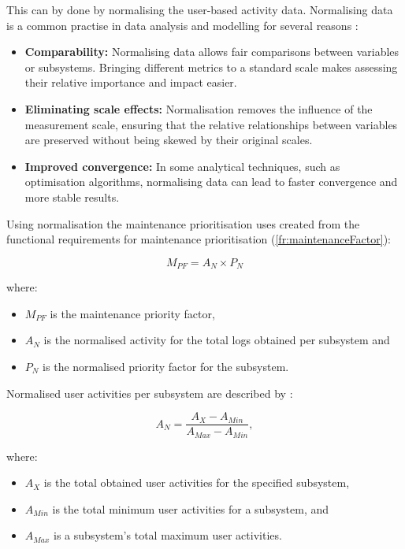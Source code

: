 This can by done by normalising the user-based activity data. Normalising data is a common practise in data analysis and modelling for several reasons \cite{Patro2015}:

\begin{itemize}
    \item \textbf{Comparability:} Normalising data allows fair comparisons between variables or subsystems. Bringing different metrics to a standard scale makes assessing their relative importance and impact easier.

    \item \textbf{Eliminating scale effects:} Normalisation removes the influence of the measurement scale, ensuring that the relative relationships between variables are preserved without being skewed by their original scales.

    \item \textbf{Improved convergence:} In some analytical techniques, such as optimisation algorithms, normalising data can lead to faster convergence and more stable results.
\end{itemize}

Using normalisation the maintenance prioritisation uses  created from the functional requirements for maintenance prioritisation (\ref{fr:maintenanceFactor}):

\begin{equation}
	\label{eq:ch2_maintenanceFactorSimplified}
	M_{PF} = A_{N} \times P_{N}
\end{equation}

where:

\begin{itemize}
	\item $M_{PF}$ is the maintenance priority factor,
	\item $A_{N}$ is the normalised activity for the total logs obtained per subsystem and
	\item $P_{N}$ is the normalised priority factor for the subsystem.
\end{itemize}

Normalised user activities per subsystem are described by :

\begin{equation}
	\label{eq:ch2_eventNormalised}
	A_{N} = \frac{A_X - A_{Min}}{A_{Max} - A_{Min}},
\end{equation}

where:

\begin{itemize}
	\item $A_X$ is the total obtained user activities for the specified subsystem,
	\item $A_{Min}$ is the total minimum user activities for a subsystem, and
	\item $A_{Max}$ is a subsystem's total maximum user activities.
\end{itemize}

